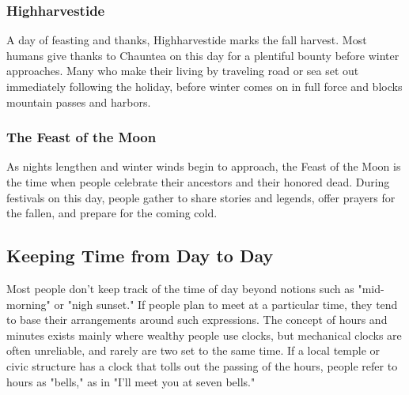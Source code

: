 \documentclass[10pt,a4paper,twoside,twocolumn,openany,bg=print,nodeprecatedcode]{dndbook}
\begin{document}
\subsubsection{Highharvestide}
A day of feasting and thanks, Highharvestide marks the fall harvest. Most humans give thanks to Chauntea on this day for a plentiful bounty before winter approaches. Many who make their living by traveling road or sea set out immediately following the holiday, before winter comes on in full force and blocks mountain passes and harbors.
\subsubsection{The Feast of the Moon}
As nights lengthen and winter winds begin to approach, the Feast of the Moon is the time when people celebrate their ancestors and their honored dead. During festivals on this day, people gather to share stories and legends, offer prayers for the fallen, and prepare for the coming cold.
\subsection{Keeping Time from Day to Day}
Most people don't keep track of the time of day beyond notions such as "mid-morning" or "nigh sunset." If people plan to meet at a particular time, they tend to base their arrangements around such expressions.
The concept of hours and minutes exists mainly where wealthy people use clocks, but mechanical clocks are often unreliable, and rarely are two set to the same time. If a local temple or civic structure has a clock that tolls out the passing of the hours, people refer to hours as "bells," as in "I'll meet you at seven bells."
\end{document}
